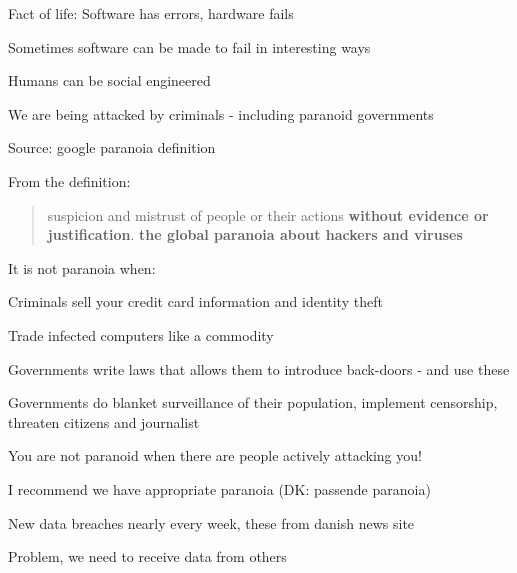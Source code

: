 \documentclass[Screen16to9,17pt]{foils}
\begin{document}

\begin{list1}
\item Fact of life: Software has errors, hardware fails
\item Sometimes software can be made to fail in interesting ways
\item Humans can be social engineered
\item We are being attacked by criminals - including paranoid governments
\end{list1}




Source: google paranoia definition


From the definition:
\begin{quote}
suspicion and mistrust of people or their actions {\bf without evidence or justification}.
{\bf the global paranoia about hackers and viruses}
\end{quote}

\begin{list1}
\item It is not paranoia when:
\begin{list2}
\item Criminals sell your credit card information and identity theft
\item Trade infected computers like a commodity
\item Governments write laws that allows them to introduce back-doors - and use these
\item Governments do blanket surveillance of their population, implement censorship, threaten citizens and journalist
\end{list2}
\end{list1}

\vskip 1cm
\centerline{You are not paranoid when there are people actively attacking you!}

I recommend we have appropriate paranoia (DK: passende paranoia)



New data breaches nearly every week, these from danish news site 

Problem, we need to receive data from others
\end{document}
